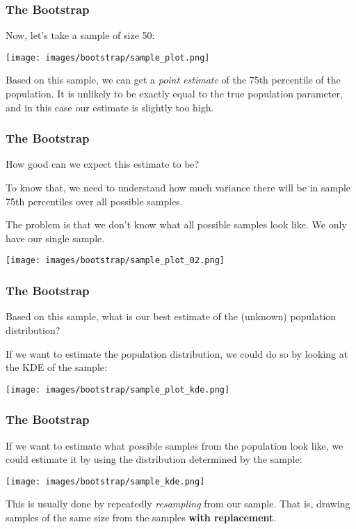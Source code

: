 \documentclass[11pt, table]{beamer}
\begin{document}
\begin{frame}
\frametitle{The Bootstrap}
Now, let's take a sample of size 50:

\begin{center}
	\texttt{[image: images/bootstrap/sample\_plot.png]}
\end{center}

Based on this sample, we can get a \emph{point estimate} of the 75th percentile of the population. It is unlikely to be exactly equal to the true population parameter, and in this case our estimate is slightly too high.
\end{frame}

\begin{frame}
\frametitle{The Bootstrap}
How good can we expect this estimate to be?
\vspace{0.1in}

To know that, we need to understand how much variance there will be in sample 75th percentiles over all possible samples.
\vspace{0.1in}

The problem is that we don't know what all possible samples look like. We only have our single sample.

\begin{center}
	\texttt{[image: images/bootstrap/sample\_plot\_02.png]}
\end{center}
\end{frame}

\begin{frame}
\frametitle{The Bootstrap}
Based on this sample, what is our best estimate of the (unknown) population distribution?
\vspace{0.1in}

If we want to estimate the population distribution, we could do so by looking at the KDE of the sample:

\begin{center}
	\texttt{[image: images/bootstrap/sample\_plot\_kde.png]}
\end{center}

\end{frame}

\begin{frame}
\frametitle{The Bootstrap}
If we want to estimate what possible samples from the population look like, we could estimate it by using the distribution determined by the sample:

\begin{center}
	\texttt{[image: images/bootstrap/sample\_kde.png]}
\end{center}

This is usually done by repeatedly \emph{resampling} from our sample. That is, drawing samples of the same size from the samples \textbf{with replacement}. 
\end{frame}
\end{document}
